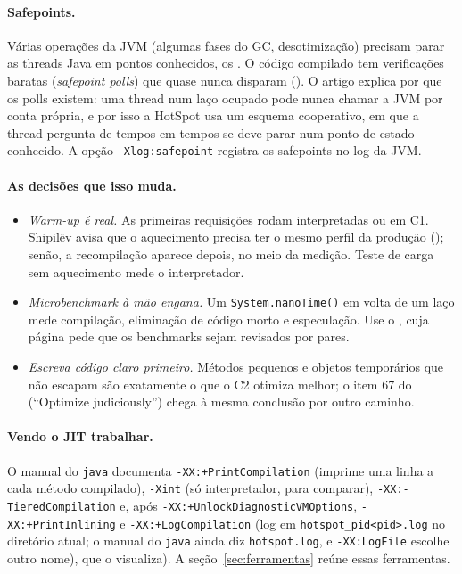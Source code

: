 \paragraph{Safepoints.}
Várias operações da JVM (algumas fases do GC, desotimização) precisam
parar as threads Java em pontos conhecidos, os
. O código compilado tem verificações baratas (\emph{safepoint
polls}) que quase nunca disparam
(). O artigo explica por que os
polls existem: uma thread num laço ocupado pode nunca chamar a JVM por
conta própria, e por isso a HotSpot usa um esquema cooperativo, em que a
thread pergunta de tempos em tempos se deve parar num ponto de estado
conhecido. A opção \texttt{-Xlog:safepoint} registra os
safepoints no log da JVM.

\paragraph{As decisões que isso muda.}
\begin{itemize}
\item \emph{Warm-up é real.} As primeiras requisições rodam interpretadas
  ou em C1. Shipilëv avisa que o aquecimento precisa ter o
  mesmo perfil da produção ();
  senão, a recompilação aparece depois, no
  meio da medição. Teste de carga sem aquecimento mede o interpretador.
\item \emph{Microbenchmark à mão engana.} Um \texttt{System.nanoTime()}
  em volta de um laço mede compilação, eliminação de código morto e
  especulação. Use o , cuja página pede que os
  benchmarks sejam revisados por pares.
\item \emph{Escreva código claro primeiro.} Métodos pequenos e objetos
  temporários que não escapam são exatamente o que o C2 otimiza melhor;
  o item 67 do  (\enquote{Optimize
  judiciously}) chega à mesma conclusão por outro caminho.
\end{itemize}

\paragraph{Vendo o JIT trabalhar.}
O manual do \texttt{java} documenta \texttt{-XX:+PrintCompilation}
(imprime uma linha a cada método compilado), \texttt{-Xint} (só
interpretador, para comparar), \texttt{-XX:-TieredCompilation} e, após
\texttt{-XX:+UnlockDiagnosticVMOptions}, \texttt{-XX:+PrintInlining} e
\texttt{-XX:+LogCompilation} (log em \texttt{hotspot\_pid<pid>.log} no
diretório atual; o manual do \texttt{java} ainda diz \texttt{hotspot.log},
e \texttt{-XX:LogFile} escolhe outro nome), que o
 visualiza). A seção~\ref{sec:ferramentas}
reúne essas ferramentas.
